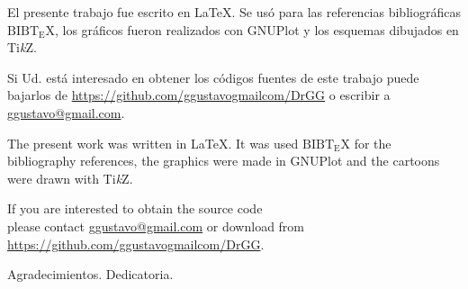 \vspace*{\fill}
 \begin{center}
	\begin{minipage}{0.70\textwidth}
	
    \begin{center}
	\scriptsize{
		El presente trabajo fue escrito en \LaTeX. Se usó para las referencias bibliográficas $\mathrm{B{\scriptstyle{IB}} \! T\!_{\displaystyle E} \! X}$, los gráficos fueron realizados con GNUPlot y los esquemas dibujados en Ti\textit{k}Z.
		
		\vspace*{1mm}
		
		Si Ud. está interesado en obtener los códigos fuentes de este trabajo puede bajarlos de 
		\url{https://github.com/ggustavogmailcom/DrGG} o escribir a \href{mailto:ggustavo@gmail.com}{ggustavo@gmail.com}.
		
		\vspace*{1cm}
		
		The present work was written in \LaTeX. It was used $\mathrm{B{\scriptstyle{IB}} \! T\!_{\displaystyle E} \! X}$ for the bibliography references, the graphics were made in GNUPlot and the cartoons were drawn with Ti\textit{k}Z.
			
		\vspace*{1mm}
		
		If you are interested to obtain the source code \\ please contact \href{mailto:ggustavo@gmail.com}{ggustavo@gmail.com} or download from \url{https://github.com/ggustavogmailcom/DrGG}.
		}
	\end{center}

	\end{minipage}
 \end{center}

\vfill
\cleardoublepage

\mtcaddchapter[Agradecimientos]
Agradecimientos. Dedicatoria.



\cleardoublepage

